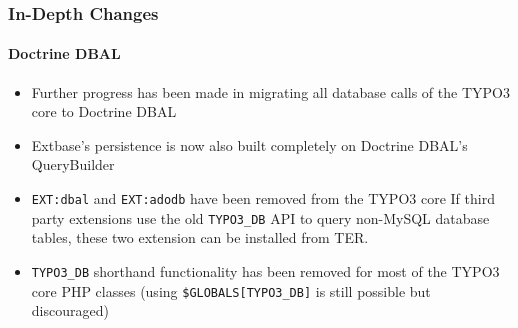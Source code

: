 
\begin{frame}[fragile]
	\frametitle{In-Depth Changes}
	\framesubtitle{Doctrine DBAL}

	\begin{itemize}
		\item Further progress has been made in migrating all database calls of the TYPO3 core to Doctrine DBAL
		\item Extbase's persistence is now also built completely on Doctrine DBAL's QueryBuilder
		\item \texttt{EXT:dbal} and \texttt{EXT:adodb} have been removed from the TYPO3 core\newline
			\smaller
				If third party extensions use the old \texttt{TYPO3\_DB} API to query non-MySQL database tables,
				these two extension can be installed from TER.
			\normalsize

		\item \texttt{TYPO3\_DB} shorthand functionality has been removed for most of the TYPO3 core PHP classes\newline
			\smaller
				(using \texttt{\$GLOBALS[TYPO3\_DB]} is still possible but discouraged)
			\normalsize

	\end{itemize}

\end{frame}


